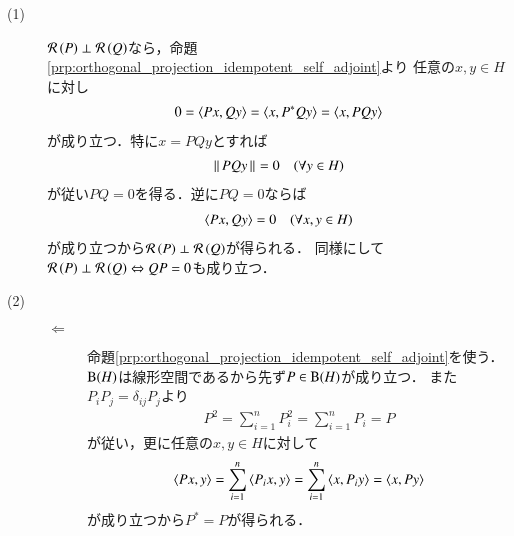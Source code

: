 	\begin{prf}\mbox{}
		\begin{description}
			\item[(1)] $\mathcal{R}\left(P\right) \perp \mathcal{R}\left(Q\right)$なら，命題\ref{prp:orthogonal_projection_idempotent_self_adjoint}より
				任意の$x,y \in H$に対し
				\begin{align}
					0 = \inprod<P x,Q y> = \inprod<x, P^*Q y> = \inprod<x, PQ y>
				\end{align}
				が成り立つ．特に$x = PQy$とすれば
				\begin{align}
					\left\|\, PQ y\, \right\|_{} = 0 \quad (\forall y \in H)
				\end{align}
				が従い$PQ = 0$を得る．逆に$PQ = 0$ならば
				\begin{align}
					\inprod<P x,Q y> = 0 \quad (\forall x,y \in H)
				\end{align}
				が成り立つから$\mathcal{R}\left(P\right) \perp \mathcal{R}\left(Q\right)$が得られる．
				同様にして$\mathcal{R}\left(P\right) \perp \mathcal{R}\left(Q\right) \Leftrightarrow QP = 0$も成り立つ．
				
			\item[(2)] 
				\begin{description}
					\item[$\Leftarrow$]
						命題\ref{prp:orthogonal_projection_idempotent_self_adjoint}を使う．
						$\mathrm{B}(H) $は線形空間であるから先ず$P \in \mathrm{B}(H) $が成り立つ．
						また$P_i P_j = \delta_{ij} P_j$より
						\begin{align}
							P^2 = \sum_{i=1}^n P_i^2 = \sum_{i=1}^n P_i = P
						\end{align}
						が従い，更に任意の$x,y \in H$に対して
						\begin{align}
							\inprod<Px,y> = \sum_{i=1}^n \inprod<P_i x,y> 
							= \sum_{i=1}^n \inprod<x,P_i y> 
							= \inprod<x,P y>
						\end{align}
						が成り立つから$P^* = P$が得られる．
						

\end{description}
\end{description}
\end{prf}

